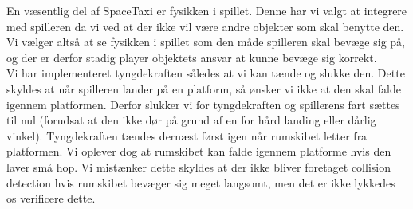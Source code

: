 En væsentlig del af SpaceTaxi er fysikken i spillet. Denne har vi valgt at integrere med spilleren da vi ved at der ikke vil være andre objekter som skal benytte den. Vi vælger altså at se fysikken i spillet som den måde spilleren skal bevæge sig på, og der er derfor stadig player objektets ansvar at kunne bevæge sig korrekt.\\
Vi har implementeret tyngdekraften således at vi kan tænde og slukke den. Dette skyldes at når spilleren lander på en platform, så ønsker vi ikke at den skal falde igennem platformen. Derfor slukker vi for tyngdekraften og spillerens fart sættes til nul (forudsat at den ikke dør på grund af en for hård landing eller dårlig vinkel). Tyngdekraften tændes dernæst først igen når rumskibet letter fra platformen. Vi oplever dog at rumskibet kan falde igennem platforme hvis den laver små hop. Vi mistænker dette skyldes at der ikke bliver foretaget collision detection hvis rumskibet bevæger sig meget langsomt, men det er ikke lykkedes os verificere dette.